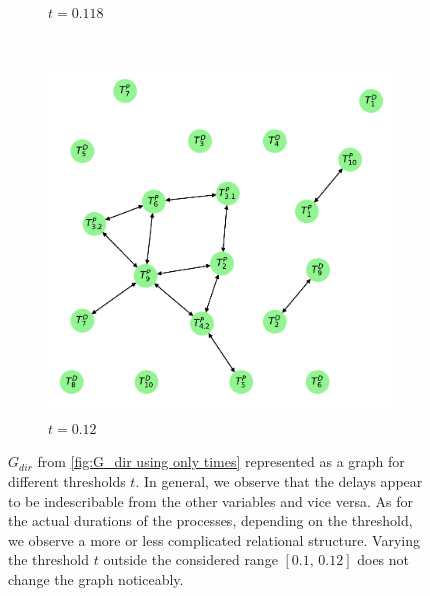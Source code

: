 \documentclass[../Thesis.tex]{subfiles}
\begin{document}
\begin{figure}[H]
\begin{subfigure}[t]{0.43\linewidth}
        \caption{$t = 0.118$}
        \label{subfig:G_dir times - graph - t 0.118}
    \end{subfigure}
    \\[\baselineskip]
    \begin{subfigure}[t]{0.43\linewidth}
        \includegraphics[width = \linewidth]{figures/Cycle data/G_dir times as graph - symmetric - 0_12.pdf}
        \caption{$t=0.12$}
        \label{subfig:G_dir times - graph - t 0.12}
    \end{subfigure}
    \caption{$G_{dir}$ from \autoref{fig:G_dir using only times} represented as a graph for different thresholds $t$. In general, we observe that the delays appear to be indescribable from the other variables and vice versa. As for the actual durations of the processes, depending on the threshold, we observe a more or less complicated relational structure. Varying the threshold $t$ outside the considered range $[0.1,\,0.12]$ does not change the graph noticeably.}
    \label{fig:G_dir times - graphs}
\end{figure}
\end{document}
